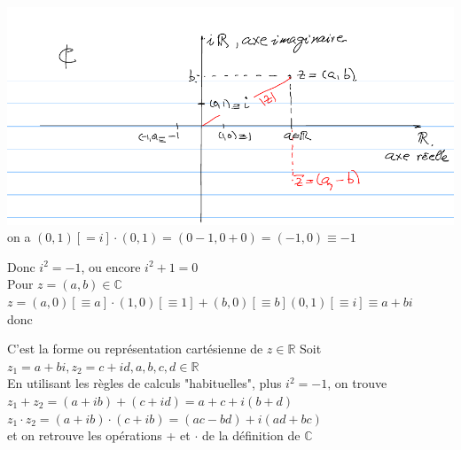 \documentclass[12pt,a4paper]{article}
\newcommand{\R}{\ensuremath{\mathbb{R}} }
\begin{document}
{\includegraphics[scale=0.7]{illustrations_Analyse/axes_complexe}
on a $(0,1) [=i] \cdot (0,1) = (0-1, 0+0) = (-1,0) \equiv -1$
\\
\begin{center}
\end{center}

Donc $i^2 = -1$, ou encore $i^2 + 1 = 0$\\
Pour $z = (a,b) \in \mathbb{C}$\\
$z = (a,0)[\equiv a]\cdot(1,0)[\equiv 1] + (b,0)[\equiv b](0,1)[\equiv i] \equiv a +bi$
\\donc
\begin{center}
\end{center}
C'est la forme ou représentation cartésienne de $z \in \R$
Soit $z_1 = a +bi, z_2 = c+id, a,b,c,d \in \R$\\
En utilisant les règles de calculs "habituelles", plus $i^2 = -1$, on trouve\\
$z_1 + z_2 = (a+ib)+(c+id) = a+c+i(b+d)$\\
$z_1\cdot z_2 = (a+ib) \cdot (c+ib) = (ac-bd)+i(ad+bc)$\\
et on retrouve les opérations + et $\cdot$ de la définition de $\mathbb{C}$
}
\end{document}
